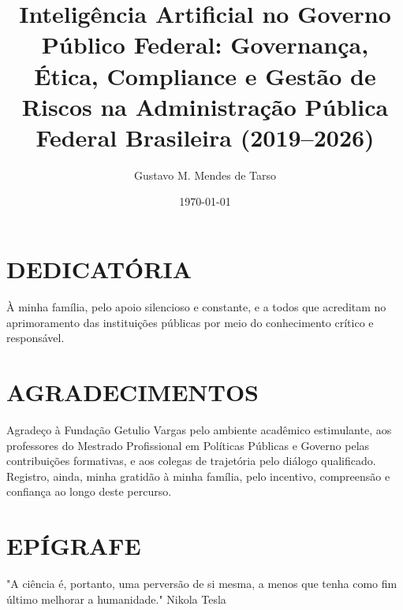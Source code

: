 \documentclass[12pt,a4paper]{article}
\author{Gustavo M. Mendes de Tarso}
\date{\today}
\title{Inteligência Artificial no Governo Público Federal: Governança, Ética, Compliance e Gestão de Riscos na Administração Pública Federal Brasileira (2019–2026)}
\begin{document}
\capa
\folhaderosto
\fichacatalograficaaviso
\folhadeaprovacao
\section*{DEDICATÓRIA}
\label{sec:org9468969}
À minha família, pelo apoio silencioso e constante, e a todos que acreditam no aprimoramento das instituições públicas por meio do conhecimento crítico e responsável.
\section*{AGRADECIMENTOS}
\label{sec:orgf1d8c1b}
Agradeço à Fundação Getulio Vargas pelo ambiente acadêmico estimulante, aos professores do Mestrado Profissional em Políticas Públicas e Governo pelas contribuições formativas, e aos colegas de trajetória pelo diálogo qualificado. Registro, ainda, minha gratidão à minha família, pelo incentivo, compreensão e confiança ao longo deste percurso.
\section*{EPÍGRAFE}
\label{sec:org35314ff}
"A ciência é, portanto, uma perversão de si mesma, a menos que tenha como fim último melhorar a humanidade."
Nikola Tesla
\end{document}
